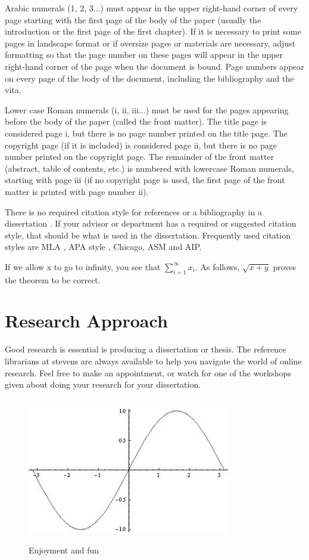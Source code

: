 Arabic numerals (1, 2, 3...) must appear in the upper right-hand corner of every page starting with the first page of the body of the paper (usually the introduction or the first page of the first chapter). If it is necessary to print some pages in landscape format or if oversize pages or materials are necessary, adjust formatting so that the page number on these pages will appear in the upper right-hand corner of the page when the document is bound. Page numbers appear on every page of the body of the document, including the bibliography and the vita.

Lower case Roman numerals (i, ii, iii...) must be used for the pages appearing before the body of the paper (called the front matter). The title page is considered page i, but there is no page number printed on the title page. The copyright page (if it is included) is considered page ii, but there is no page number printed on the copyright page. The remainder of the front matter (abstract, table of contents, etc.) is numbered with lowercase Roman numerals, starting with page iii (if no copyright page is used, the first page of the front matter is printed with page number ii). 

There is no required citation style for references or a bibliography in a dissertation \cite{rabinowitz_manual_2009}.  If your advisor or department has a required or suggested citation style, that should be what is used in the dissertation.  Frequently used citation styles are MLA \cite{gibaldi_mla}, APA style \cite{APA}, Chicago, ASM and AIP.    

If we allow x to go to infinity, you see that 
$\sum_{i=1}^{\infty} x_{i}$.  As follows, $\sqrt{x+y}$ proves the theorem to be correct.
 
\section{Research Approach}
Good research is essential is producing a dissertation or thesis.  The reference librarians at stevens are always available to help you navigate the world of online research.  Feel free to make an appointment, or watch for one of the workshops given about doing your research for your dissertation.  

\begin{figure}
\centering
\includegraphics[height=2.5in, width=3.5in]{introduction/figures/sin_x.jpg}
\caption{Enjoyment and fun}
\end{figure}

